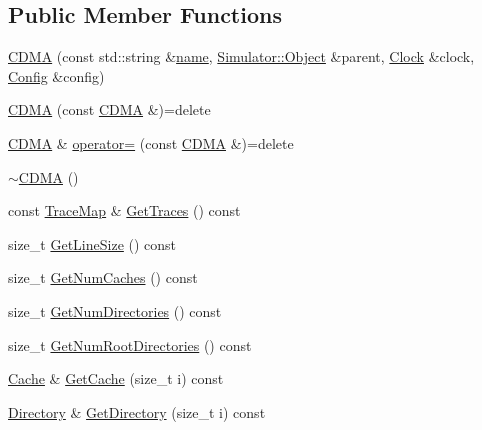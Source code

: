 \subsection*{Public Member Functions}
\begin{DoxyCompactItemize}
\item 
\hyperlink{class_simulator_1_1_c_d_m_a_a132bbe72b74a22522e6dc86602b21174}{C\+D\+M\+A} (const std\+::string \&\hyperlink{mtconf_8c_a8f8f80d37794cde9472343e4487ba3eb}{name}, \hyperlink{class_simulator_1_1_object}{Simulator\+::\+Object} \&parent, \hyperlink{class_simulator_1_1_clock}{Clock} \&clock, \hyperlink{class_config}{Config} \&config)
\item 
\hyperlink{class_simulator_1_1_c_d_m_a_a8abcbf3b82c72cb4fb4b30d90826b87c}{C\+D\+M\+A} (const \hyperlink{class_simulator_1_1_c_d_m_a}{C\+D\+M\+A} \&)=delete
\item 
\hyperlink{class_simulator_1_1_c_d_m_a}{C\+D\+M\+A} \& \hyperlink{class_simulator_1_1_c_d_m_a_ad5a353a58e74ccb0123f02172be240c6}{operator=} (const \hyperlink{class_simulator_1_1_c_d_m_a}{C\+D\+M\+A} \&)=delete
\item 
\hyperlink{class_simulator_1_1_c_d_m_a_a03a680b074441a63dd2b0d683281edbf}{$\sim$\+C\+D\+M\+A} ()
\item 
const \hyperlink{class_simulator_1_1_c_d_m_a_ace88d950567607d699d7ad9e9cbbb3ef}{Trace\+Map} \& \hyperlink{class_simulator_1_1_c_d_m_a_a4de85bcf3157e1397722ecc31f724db5}{Get\+Traces} () const 
\item 
size\+\_\+t \hyperlink{class_simulator_1_1_c_d_m_a_a1f6b0672542b059459daed2b1bfbc631}{Get\+Line\+Size} () const 
\item 
size\+\_\+t \hyperlink{class_simulator_1_1_c_d_m_a_abb23eb9bc76d8956d85b011192e8e060}{Get\+Num\+Caches} () const 
\item 
size\+\_\+t \hyperlink{class_simulator_1_1_c_d_m_a_a714d64971edecd4a868bb50811dc25cd}{Get\+Num\+Directories} () const 
\item 
size\+\_\+t \hyperlink{class_simulator_1_1_c_d_m_a_afa4996da3fba98f8046f1728b4432cd1}{Get\+Num\+Root\+Directories} () const 
\item 
\hyperlink{class_simulator_1_1_c_d_m_a_1_1_cache}{Cache} \& \hyperlink{class_simulator_1_1_c_d_m_a_a0f3e7db3a0c19c2907b52d8450affc7f}{Get\+Cache} (size\+\_\+t i) const 
\item 
\hyperlink{class_simulator_1_1_c_d_m_a_1_1_directory}{Directory} \& \hyperlink{class_simulator_1_1_c_d_m_a_ae5d66fe4bd21eecce03d5f52b0884dc2}{Get\+Directory} (size\+\_\+t i) const 
\item 

\end{DoxyCompactItemize}

